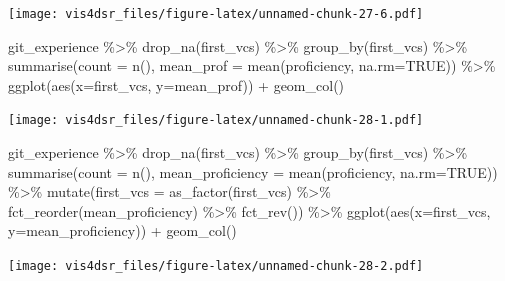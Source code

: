 \documentclass[
]{krantz}
\makeatletter
\newenvironment{Shaded}{\begin{snugshade}}{\end{snugshade}}
\newcommand{\AttributeTok}[1]{\textcolor[rgb]{0.61,0.61,0.61}{#1}}
\newcommand{\ConstantTok}[1]{\textcolor[rgb]{0,0,0}{#1}}
\newcommand{\FunctionTok}[1]{\textcolor[rgb]{0,0,0}{#1}}
\newcommand{\NormalTok}[1]{#1}
\newcommand{\SpecialCharTok}[1]{\textcolor[rgb]{0,0,0}{#1}}
\newenvironment{kframe}{%
\medskip{}
\setlength{\fboxsep}{.8em}
 \def\at@end@of@kframe{}%
 \ifinner\ifhmode%
  \def\at@end@of@kframe{\end{minipage}}%
  \begin{minipage}{\columnwidth}%
 \fi\fi%
 \def\FrameCommand##1{\hskip\@totalleftmargin \hskip-\fboxsep
 \colorbox{shadecolor}{##1}\hskip-\fboxsep
     \hskip-\linewidth \hskip-\@totalleftmargin \hskip\columnwidth}%
 \MakeFramed {\advance\hsize-\width
   \@totalleftmargin\z@ \linewidth\hsize
   \@setminipage}}%
 {\par\unskip\endMakeFramed%
 \at@end@of@kframe}
\renewenvironment{Shaded}{\begin{kframe}}{\end{kframe}}
\makeatother
\begin{document}
\texttt{[image: vis4dsr\_files/figure-latex/unnamed-chunk-27-6.pdf]}

\begin{Shaded}
\begin{Highlighting}[]
\NormalTok{git\_experience }\SpecialCharTok{\%\textgreater{}\%} \FunctionTok{drop\_na}\NormalTok{(first\_vcs) }\SpecialCharTok{\%\textgreater{}\%}
  \FunctionTok{group\_by}\NormalTok{(first\_vcs) }\SpecialCharTok{\%\textgreater{}\%} 
  \FunctionTok{summarise}\NormalTok{(}\AttributeTok{count =} \FunctionTok{n}\NormalTok{(), }\AttributeTok{mean\_prof =} \FunctionTok{mean}\NormalTok{(proficiency, }\AttributeTok{na.rm=}\ConstantTok{TRUE}\NormalTok{)) }\SpecialCharTok{\%\textgreater{}\%}
  \FunctionTok{ggplot}\NormalTok{(}\FunctionTok{aes}\NormalTok{(}\AttributeTok{x=}\NormalTok{first\_vcs, }\AttributeTok{y=}\NormalTok{mean\_prof)) }\SpecialCharTok{+}
    \FunctionTok{geom\_col}\NormalTok{()}
\end{Highlighting}
\end{Shaded}

\texttt{[image: vis4dsr\_files/figure-latex/unnamed-chunk-28-1.pdf]}

\begin{Shaded}
\begin{Highlighting}[]
\NormalTok{git\_experience }\SpecialCharTok{\%\textgreater{}\%} 
  \FunctionTok{drop\_na}\NormalTok{(first\_vcs) }\SpecialCharTok{\%\textgreater{}\%}
  \FunctionTok{group\_by}\NormalTok{(first\_vcs) }\SpecialCharTok{\%\textgreater{}\%} 
  \FunctionTok{summarise}\NormalTok{(}\AttributeTok{count =} \FunctionTok{n}\NormalTok{(), }\AttributeTok{mean\_proficiency =} \FunctionTok{mean}\NormalTok{(proficiency, }\AttributeTok{na.rm=}\ConstantTok{TRUE}\NormalTok{)) }\SpecialCharTok{\%\textgreater{}\%}
  \FunctionTok{mutate}\NormalTok{(}\AttributeTok{first\_vcs =} \FunctionTok{as\_factor}\NormalTok{(first\_vcs) }\SpecialCharTok{\%\textgreater{}\%} 
           \FunctionTok{fct\_reorder}\NormalTok{(mean\_proficiency) }\SpecialCharTok{\%\textgreater{}\%} \FunctionTok{fct\_rev}\NormalTok{()) }\SpecialCharTok{\%\textgreater{}\%}
  \FunctionTok{ggplot}\NormalTok{(}\FunctionTok{aes}\NormalTok{(}\AttributeTok{x=}\NormalTok{first\_vcs, }\AttributeTok{y=}\NormalTok{mean\_proficiency)) }\SpecialCharTok{+}
    \FunctionTok{geom\_col}\NormalTok{()}
\end{Highlighting}
\end{Shaded}

\texttt{[image: vis4dsr\_files/figure-latex/unnamed-chunk-28-2.pdf]}
\end{document}
